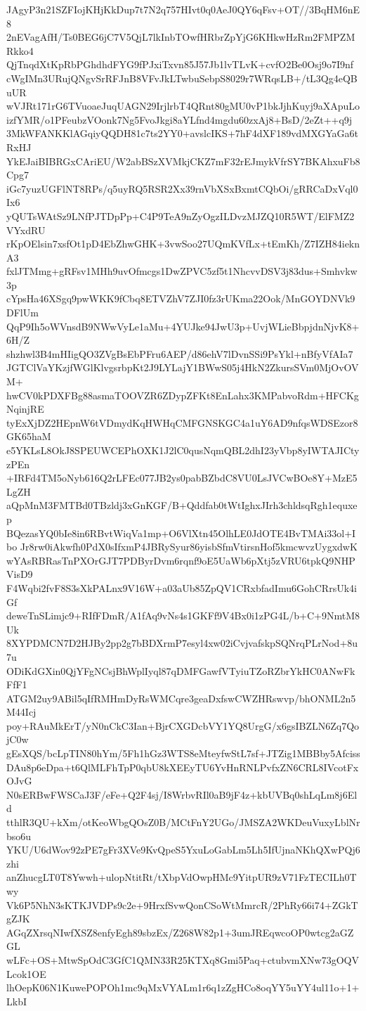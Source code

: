 JAgyP3n21SZFIojKHjKkDup7t7N2q757HIvt0q0AeJ0QY6qFsv+OT//3BqHM6nE8
2nEVagAfH/Ts0BEG6jC7V5QjL7lkInbTOwfHRbrZpYjG6KHkwHzRm2FMPZMRkko4
QjTnqdXtKpRbPGhdhdFYG9fPJxiTxvn85J57Jb1lvTLvK+cvfO2Be0Osj9o7I9nf
cWgIMn3URujQNgvSrRFJnB8VFvJkLTwbuSebpS8029r7WRqsLB+/tL3Qg4eQBuUR
wVJRt171rG6TVuoaeJuqUAGN29IrjlrbT4QRnt80gMU0vP1bkJjhKuyj9aXApuLo
izfYMR/o1PFeubzVOonk7Ng5FvoJkgi8aYLfnd4mgdu60zxAj8+BsD/2eZt++q9j
3MkWFANKKlAGqiyQQDH81c7ts2YY0+avslcIKS+7hF4dXF189vdMXGYaGa6tRxHJ
YkEJaiBIBRGxCAriEU/W2abBSzXVMkjCKZ7mF32rEJmykVfrSY7BKAhxuFb8Cpg7
iGc7yuzUGFlNT8RPs/q5uyRQ5RSR2Xx39rnVbXSxBxmtCQbOi/gRRCaDxVql0Ix6
yQUTsWAtSz9LNfPJTDpPp+C4P9TeA9nZyOgzILDvzMJZQ10R5WT/ElFMZ2VYxdRU
rKpOElsin7xsfOt1pD4EbZhwGHK+3vwSoo27UQmKVfLx+tEmKh/Z7IZH84ieknA3
fxlJTMmg+gRFsv1MHh9uvOfmcgs1DwZPVC5zf5t1NhcvvDSV3j83dus+Smhvkw3p
cYpsHa46XSgq9pwWKK9fCbq8ETVZhV7ZJI0fz3rUKma22Ook/MnGOYDNVk9DFlUm
QqP9Ih5oWVnsdB9NWwVyLe1aMu+4YUJke94JwU3p+UvjWLieBbpjdnNjvK8+6H/Z
shzhwl3B4mHIigQO3ZVgBsEbPFru6AEP/d86ehV7lDvnSSi9PsYkl+nBfyVfAIa7
JGTClVaYKzjfWGlKlvgsrbpKt2J9LYLajY1BWwS05j4HkN2ZkursSVm0MjOvOVM+
hwCV0kPDXFBg88asmaTOOVZR6ZDypZFKt8EnLahx3KMPabvoRdm+HFCKgNqinjRE
tyExXjDZ2HEpnW6tVDmydKqHWHqCMFGNSKGC4a1uY6AD9nfqsWDSEzor8GK65haM
e5YKLsL8OkJ8SPEUWCEPhOXK1J2lC0qusNqmQBL2dhI23yVbp8yIWTAJICtyzPEn
+IRFd4TM5oNyb616Q2rLFEc077JB2ys0pabBZbdC8VU0LsJVCwBOe8Y+MzE5LgZH
aQpMnM3FMTBd0TBzldj3xGnKGF/B+Qddfab0tWtIghxJIrh3chldsqRgh1equxep
BQezasYQ0bIe8in6RBvtWiqVa1mp+O6VlXtn45OlhLE0JdOTE4BvTMAi33ol+Ibo
Jr8rw0iAkwfh0PdX0sIfxmP4JBRySyur86yisbSfmVtirsnHof5kmcwvzUygxdwK
wYAsRBRasTnPXOrGJT7PDByrDvm6rqnf9oE5UaWb6pXtj5zVRU6tpkQ9NHPVisD9
F4Wqbi2fvF8S3sXkPALnx9V16W+a03aUb85ZpQV1CRxbfadImu6GohCRrsUk4iGf
deweTnSLimjc9+RIfFDmR/A1fAq9vNs4s1GKFf9V4Bx0i1zPG4L/b+C+9NmtM8Uk
8XYPDMCN7D2HJBy2pp2g7bBDXrmP7esyl4xw02iCvjvafskpSQNrqPLrNod+8u7u
ODiKdGXin0QjYFgNCsjBhWplIyql87qDMFGawfVTyiuTZoRZbrYkHC0ANwFkFfF1
ATGM2uy9ABil5qIfRMHmDyRsWMCqre3geaDxfswCWZHRswvp/bhONML2n5M44Icj
poy+RAuMkErT/yN0nCkC3Ian+BjrCXGDcbVY1YQ8UrgG/x6gsIBZLN6Zq7QojC0w
gEsXQS/bcLpTIN80hYm/5Fh1hGz3WTS8eMteyfwStL7sf+JTZig1MBBby5Afciss
DAu8p6eDpa+t6QlMLFhTpP0qbU8kXEEyTU6YvHnRNLPvfxZN6CRL8IVcotFxOJvG
N0sERBwFWSCaJ3F/eFe+Q2F4sj/I8WrbvRIl0aB9jF4z+kbUVBq0shLqLm8j6Eld
tthlR3QU+kXm/otKeoWbgQOsZ0B/MCtFnY2UGo/JMSZA2WKDeuVuxyLblNrbso6u
YKU/U6dWov92zPE7gFr3XVe9KvQpeS5YxuLoGabLm5Lh5IfUjnaNKhQXwPQj6zhi
anZhucgLT0T8Ywwh+ulopNtitRt/tXbpVdOwpHMc9YitpUR9zV71FzTECILh0Twy
Vk6P5NhN3sKTKJVDPs9c2e+9HrxfSvwQonCSoWtMmrcR/2PhRy66i74+ZGkTgZJK
AGqZXrsqNIwfXSZ8enfyEgh89sbzEx/Z268W82p1+3umJREqwcoOP0wtcg2aGZGL
wLFc+OS+MtwSpOdC3GfC1QMN33R25KTXq8Gmi5Paq+ctubvmXNw73gOQVLcok1OE
lhOepK06N1KuwePOPOh1mc9qMxVYALm1r6q1zZgHCo8oqYY5uYY4ul11o+1+LkbI
